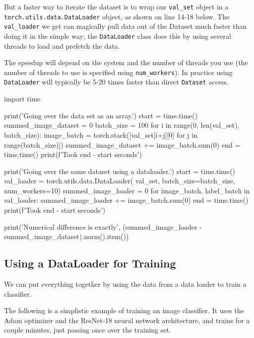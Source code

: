 But a faster way to iterate the dataset is to wrap our \texttt{val\_set} object in a \texttt{torch.utils.data.DataLoader} object, as shown on line 14-18 below. The \texttt{val\_loader} we get can magically pull data out of the Dataset much faster than doing it in the simple way; the \texttt{DataLoader} class does this by using several threads to load and prefetch the data. 

The speedup will depend on the system and the number of threads you use (the number of threads to use is specified using \texttt{num\_workers}). In practice using \texttt{DataLoader} will typically be 5-20 times faster than direct \texttt{Dataset} access. 

\begin{codeblock}[language=python]
import time

print('Going over the data set as an array.')
start = time.time()
summed_image_dataset = 0
batch_size = 100
for i in range(0, len(val_set), batch_size):
    image_batch = torch.stack([val_set[i+j][0] for j in range(batch_size)])
    summed_image_dataset += image_batch.sum(0)
end = time.time()
print(f'Took {end - start} seconds')

print('Going over the same dataset using a dataloader.')
start = time.time()
val_loader = torch.utils.data.DataLoader(
    val_set, batch_size=batch_size, num_workers=10)
summed_image_loader = 0
for image_batch, label_batch in val_loader:
    summed_image_loader += image_batch.sum(0)
end = time.time()
print(f'Took {end - start} seconds')

print('Numerical difference is exactly', (summed_image_loader - summed_image_dataset).norm().item())
\end{codeblock}

\subsection{Using a DataLoader for Training}

We can put everything together by using the data from a data loader to train a classifier. 

The following is a simplistic example of training an image classifier. It uses the Adam optimizer and the ResNet-18 neural network architecture, and trains for a couple minutes, just passing once over the training set. 


